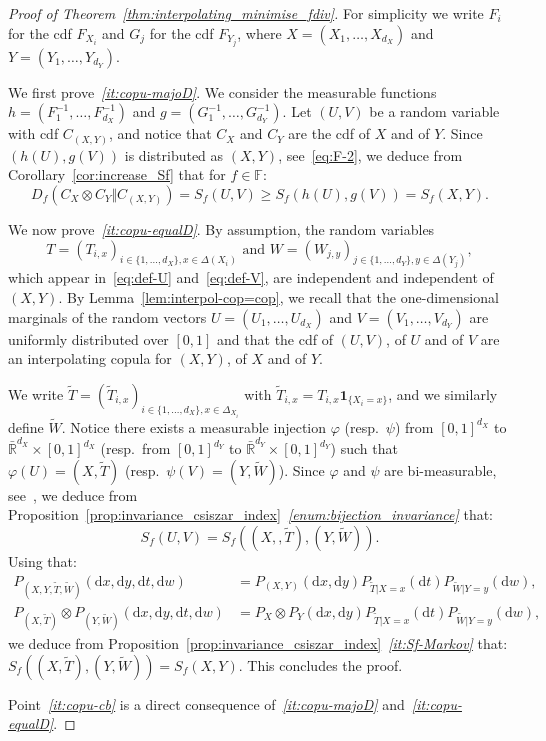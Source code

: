 \documentclass[12pt]{article}
\newcommand{\F}{{\mathbb F}}
\newcommand{\R}{{\mathbb R}}
\newcommand{\ind}{\mathbf{1}}
\newcommand{\rd}{\mathrm{d}}
\theoremstyle{plain}
\theoremstyle{remark}
\begin{document}
\begin{proof}[Proof of Theorem~\ref{thm:interpolating_minimise_fdiv}]
For simplicity we write  $F_i$ for the cdf $F_{X_i}$ and $G_j$ for the
cdf $F_{Y_j}$, where $X=(X_1, \ldots, X_{d_X})$ and $Y=(Y_1, \ldots,
Y_{d_Y})$. 

We   first  prove~{\it \ref{it:copu-majoD}}.    We  consider   the  measurable
functions    $h  =    (F_1^{-1},   \dots,    F_{d_X}^{-1})$   and
$g=(G_1^{-1},  \dots ,  G_{d_Y}^{-1})$.   Let  
$(U,V)$  be a  random  variable with  cdf $C_{(X,Y)}$, and notice  that $C_X$ and $C_Y$  are the
cdf of $X $ and of $Y$.  Since $(h(U), g(V))$ is distributed as
$(X,Y)$, see~\eqref{eq:F-2}, we deduce from Corollary~\ref{cor:increase_Sf} that for $f\in \F$:
\[
    D_f(C_X \otimes C_Y \Vert C_{(X,Y)}) = S_f(U,V) \geq S_f(h(U),
    g(V)) = S_f(X,Y). 
\]
  

We now  prove~{\it \ref{it:copu-equalD}}.   By  assumption,  the  random  variables 
$$
T=(T_{i,x})_{i\in   \{1,   \ldots,   d_X\},  x\in   \Delta(X_i)} \text{  and }
W=(W_{j,y})_{j\in   \{1,   \ldots,   d_Y\},  y\in   \Delta(Y_j)},
$$
which appear in~\eqref{eq:def-U}
and~\eqref{eq:def-V},    are
independent       and       independent      of       $(X,Y)$.        By
Lemma~\ref{lem:interpol-cop=cop},  we  recall that  the  one-dimensional
marginals  of  the  random  vectors  $U=(U_1, \ldots,  U_{d_X})$  and
$V=( V_1, \ldots,  V_{d_Y})$ are uniformly distributed  over $[0,1]$ and
that the cdf of  $(U,V)$, of $U$ and of $V$  are an interpolating copula
for $(X,Y)$, of $X$ and of $Y$.

  We write $\tilde T=(\tilde T_{i,x})_{i\in  \{1, \ldots,  d_X\}, x \in  \Delta_{X_i} }
   $ with $\tilde  T_{i,x}= T_{i,x} \ind_{\{X_i=x\}}$, and we similarly
   define $\tilde W$. Notice there 
   exists a measurable injection $\varphi$ (resp.\ $\psi$) from $[0, 1]^{d_X}$ to $\bar \R^{d_X} \times [0, 1]^{d_X}$ (resp.\
   from $[0, 1]^{d_Y}$ to $\bar \R^{d_Y} \times [0, 1]^{d_Y}$) such that $\varphi(U)=(X ,\tilde T)$
   (resp.\ $\psi(V)=(Y, \tilde W)$). Since $\varphi$ and $\psi$ are bi-measurable, see~\cite{purves1966bimeasurable}, we deduce from
   Proposition~\ref{prop:invariance_csiszar_index}~{\it \ref{enum:bijection_invariance}} that:
$$
S_f(U,V)=S_f((X, , \tilde T), (Y, \tilde W)).
$$
Using that:
   \begin{align*}
      P_{(X,Y, \tilde T, \tilde W)} (\rd x, \rd y,
     \rd t ,\rd w)
     &=P_{(X,Y)}(\rd x, \rd y) P_{\tilde T|X=x} (\rd t) 
   P_{\tilde        W|Y=y} (\rd w) ,\\
     P_{(X, \tilde T)}\otimes P_{(Y, \tilde W)} (\rd x, \rd y,
     \rd t , \rd w)
     &=P_X\otimes P_Y (\rd x, \rd y) P_{\tilde T|X=x} (\rd t) 
   P_{\tilde      W|Y=y} (\rd w),
   \end{align*}
   we deduce from Proposition~\ref{prop:invariance_csiszar_index}~{\it \ref{it:Sf-Markov}}
 that:
 $S_f((X, \tilde T), (Y, \tilde W))=S_f(X,Y)$. This concludes the
proof.

Point~{\it \ref{it:copu-cb}} is a direct consequence of~{\it \ref{it:copu-majoD}}
and~{\it \ref{it:copu-equalD}}.
\end{proof}
\end{document}
